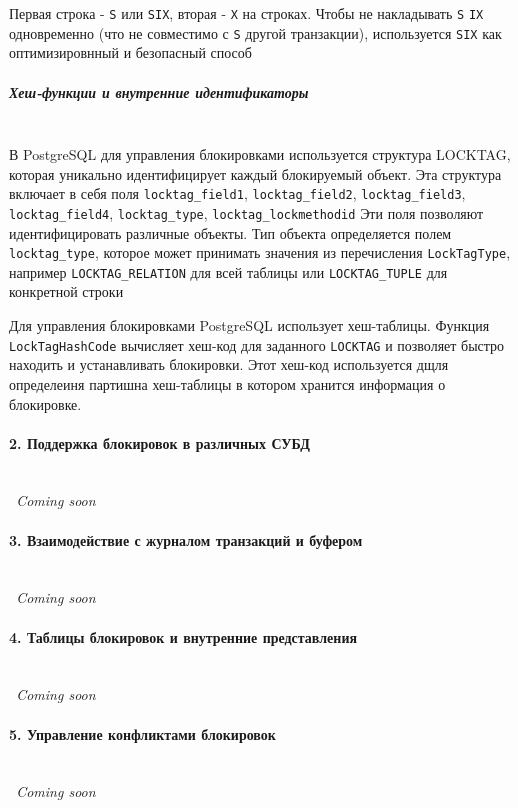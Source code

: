  Первая строка - \texttt{S} или \texttt{SIX}, вторая - \texttt{X} на строках. 
 Чтобы не накладывать \texttt{S} \+ \texttt{IX} одновременно (что не совместимо с \texttt{S} другой транзакции), используется \texttt{SIX} как оптимизировнный и безопасный способ

\subparagraph{Хеш-функции и внутренние идентификаторы} ~\\

 В PostgreSQL для управления блокировками используется структура LOCKTAG, которая уникально идентифицирует каждый блокируемый объект. Эта структура включает в себя поля \texttt{locktag\_field1}, \texttt{locktag\_field2}, \texttt{locktag\_field3}, \texttt{locktag\_field4}, \texttt{locktag\_type}, \texttt{locktag\_lockmethodid} \autocite{PostgreSQLlockh1, PostgreSQLlockh2}
 Эти поля позволяют идентифицировать различные объекты. Тип объекта определяется полем \texttt{locktag\_type}, которое может принимать значения из перечисления \texttt{LockTagType}, например \texttt{LOCKTAG\_RELATION} для всей таблицы или \texttt{LOCKTAG\_TUPLE} для конкретной строки
 
 Для управления блокировками PostgreSQL использует хеш-таблицы. Функция \texttt{LockTagHashCode} вычисляет хеш-код для заданного \texttt{LOCKTAG} и позволяет быстро находить и устанавливать блокировки. Этот хеш-код используется дщля определеиня партишна хеш-таблицы в котором хранится информация о блокировке. \autocite{PostgreSQLlockc1, PostgreSQLlockc2}

\paragraph{2. Поддержка блокировок в различных СУБД} ~\\
\textit{~Coming soon}

\paragraph{3. Взаимодействие с журналом транзакций и буфером} ~\\
\textit{~Coming soon}

\paragraph{4. Таблицы блокировок и внутренние представления} ~\\
\textit{~Coming soon}

\paragraph{5. Управление конфликтами блокировок} ~\\
\textit{~Coming soon}

